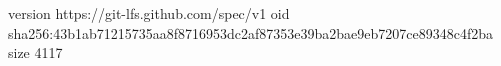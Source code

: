 version https://git-lfs.github.com/spec/v1
oid sha256:43b1ab71215735aa8f8716953dc2af87353e39ba2bae9eb7207ce89348c4f2ba
size 4117

